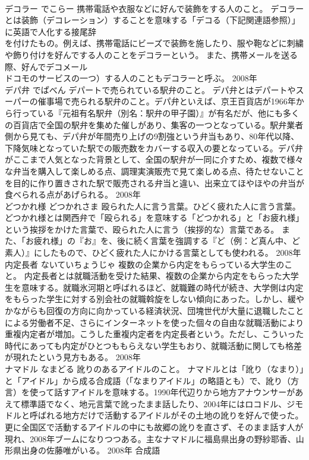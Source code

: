 \documentclass[8pt]{extreport}
\begin{document}
\begin{CJK}{UTF8}{min}
\\	デコラー	でこらー	携帯電話や衣服などに好んで装飾をする人のこと。	デコラーとは装飾（デコレーション）することを意味する「デコる（下記関連語参照）」に英語で人化する接尾辞
\\	を付けたもの。例えば、携帯電話にビーズで装飾を施したり、服や鞄などに刺繍や飾り付けを好んでする人のことをデコラーという。 また、携帯メールを送る際、好んでデコメール
\\	ドコモのサービスの一つ）する人のこともデコラーと呼ぶ。	2008年	
\\	デパ弁	でぱべん	デパートで売られている駅弁のこと。	デパ弁とはデパートやスーパーの催事場で売られる駅弁のこと。デパ弁といえば、京王百貨店が1966年から行っている『元祖有名駅弁（別名：駅弁の甲子園）』が有名だが、他にも多くの百貨店で全国の駅弁を集めた催しがあり、集客の一つとなっている。駅弁業者側から見ても、デパ弁が年間売り上げの9割強という弁当もあり、80年代以降、下降気味となっていた駅での販売数をカバーする収入の要となっている。デパ弁がここまで人気となった背景として、全国の駅弁が一同に介すため、複数で様々な弁当を購入して楽しめる点、調理実演販売で見て楽しめる点、待たせないことを目的に作り置きされた駅で販売される弁当と違い、出来立てほやほやの弁当が食べられる点があげられる。	2008年	
\\	どつかれ様	どつかれさま	殴られた人に言う言葉。ひどく疲れた人に言う言葉。	どつかれ様とは関西弁で「殴られる」を意味する「どつかれる」と「お疲れ様」という挨拶をかけた言葉で、殴られた人に言う（挨拶的な）言葉である。 また、「お疲れ様」の『お』を、後に続く言葉を強調する『ど（例：ど真ん中、ど素人）』にしたもので、ひどく疲れた人にかける言葉としても使われる。	2008年	
\\	内定長者	ないていちょうじゃ	複数の企業から内定をもらっている大学生のこと。	内定長者とは就職活動を受けた結果、複数の企業から内定をもらった大学生を意味する。就職氷河期と呼ばれるほど、就職難の時代が続き、大学側は内定をもらった学生に対する別会社の就職斡旋をしない傾向にあった。しかし、緩やかながらも回復の方向に向かっている経済状況、団塊世代が大量に退職したことによる労働者不足、さらにインターネットを使った個々の自由な就職活動により重複内定者が増加。こうした重複内定者を内定長者という。ただし、こういった時代にあっても内定がひとつももらえない学生もおり、就職活動に関しても格差が現れたという見方もある。	2008年	
\\	ナマドル	なまどる	訛りのあるアイドルのこと。	ナマドルとは「訛り（なまり）」と「アイドル」から成る合成語（「なまりアイドル」の略語とも）で、訛り（方言）を使って話すアイドルを意味する。1990年代辺りから地方アナウンサーがあえて標準語でなく、地元言葉で訛ったまま話したり、2004年にはロコドル、ジモドルと呼ばれる地方だけで活動するアイドルがその土地の訛りを好んで使った。更に全国区で活動するアイドルの中にも故郷の訛りを直さず、そのまま話す人が現れ、2008年ブームになりつつある。主なナマドルに福島県出身の野紗耶香、山形県出身の佐藤唯がいる。	2008年	合成語	

\end{CJK}
\end{document}
